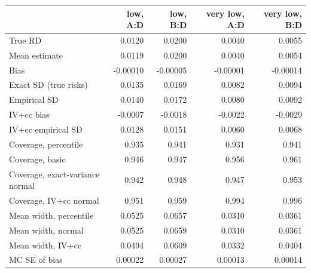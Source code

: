\begin{tabular}{lrrrr}
\toprule
 & low, A:D & low, B:D & very low, A:D & very low, B:D \\
\midrule
True RD & 0.0120 & 0.0200 & 0.0040 & 0.0055 \\
Mean estimate & 0.0119 & 0.0200 & 0.0040 & 0.0054 \\
Bias & -0.00010 & -0.00005 & -0.00001 & -0.00014 \\
Exact SD (true risks) & 0.0135 & 0.0169 & 0.0082 & 0.0094 \\
Empirical SD & 0.0140 & 0.0172 & 0.0080 & 0.0092 \\
IV+cc bias & -0.0007 & -0.0018 & -0.0022 & -0.0029 \\
IV+cc empirical SD & 0.0128 & 0.0151 & 0.0060 & 0.0068 \\
Coverage, percentile & 0.935 & 0.941 & 0.931 & 0.941 \\
Coverage, basic & 0.946 & 0.947 & 0.956 & 0.961 \\
Coverage, exact-variance normal & 0.942 & 0.948 & 0.947 & 0.953 \\
Coverage, IV+cc normal & 0.951 & 0.959 & 0.994 & 0.996 \\
Mean width, percentile & 0.0525 & 0.0657 & 0.0310 & 0.0361 \\
Mean width, normal & 0.0525 & 0.0659 & 0.0310 & 0.0361 \\
Mean width, IV+cc & 0.0494 & 0.0609 & 0.0332 & 0.0404 \\
MC SE of bias & 0.00022 & 0.00027 & 0.00013 & 0.00014 \\
\bottomrule
\end{tabular}

